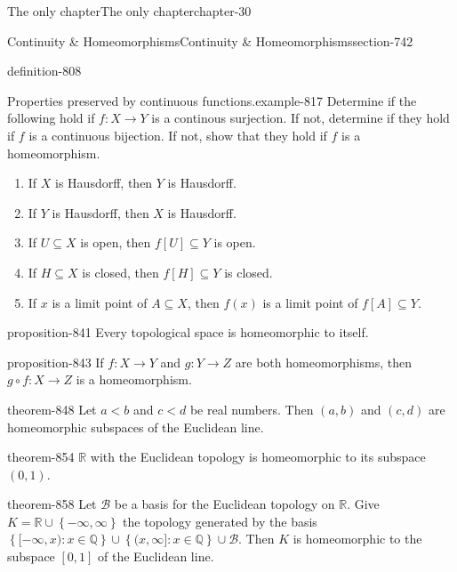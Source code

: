 \documentclass[oneside,10pt,]{book}
\newcommand{\mb}{\mathbb}
\newcommand{\mc}{\mathcal}
\newcommand{\setBuilder}[2]{\left\{#1:#2\right\}}
\newcommand{\setList}[1]{\left\{#1\right\}}
\newcommand{\lt}{<}
\begin{document}
\begin{chapterptx}{The only chapter}{}{The only chapter}{}{}{chapter-30}
\begin{sectionptx}{Continuity \& Homeomorphisms}{}{Continuity \& Homeomorphisms}{}{}{section-742}
\begin{definition}{}{definition-808}
\end{definition}
\begin{example}{Properties preserved by continuous functions.}{example-817}%
\hypertarget{p-819}{}%
Determine if the following hold if \(f:X\to Y\) is a continous surjection. If not, determine if they hold if \(f\) is a continuous bijection. If not, show that they hold if \(f\) is a homeomorphism.%
\leavevmode%
\begin{enumerate}
\item\hypertarget{li-824}{}If \(X\) is Hausdorff, then \(Y\) is Hausdorff.%
\item\hypertarget{li-827}{}If \(Y\) is Hausdorff, then \(X\) is Hausdorff.%
\item\hypertarget{li-830}{}If \(U\subseteq X\) is open, then \(f[U]\subseteq Y\) is open.%
\item\hypertarget{li-833}{}If \(H\subseteq X\) is closed, then \(f[H]\subseteq Y\) is closed.%
\item\hypertarget{li-836}{}If \(x\) is a limit point of \(A\subseteq X\), then \(f(x)\) is a limit point of \(f[A]\subseteq Y\).%
\end{enumerate}
\end{example}
\begin{proposition}{}{}{proposition-841}%
\hypertarget{p-842}{}%
Every topological space is homeomorphic to itself.%
\end{proposition}
\begin{proposition}{}{}{proposition-843}%
\hypertarget{p-844}{}%
If \(f:X\to Y\) and \(g:Y\to Z\) are both homeomorphisms, then \(g\circ f:X\to Z\) is a homeomorphism.%
\end{proposition}
\begin{theorem}{}{}{theorem-848}%
\hypertarget{p-849}{}%
Let \(a\lt b\) and \(c\lt d\) be real numbers. Then \((a,b)\) and \((c,d)\) are homeomorphic subspaces of the Euclidean line.%
\end{theorem}
\begin{theorem}{}{}{theorem-854}%
\hypertarget{p-855}{}%
\(\mb R\) with the Euclidean topology is homeomorphic to its subspace \((0,1)\).%
\end{theorem}
\begin{theorem}{}{}{theorem-858}%
\hypertarget{p-859}{}%
Let \(\mc B\) be a basis for the Euclidean topology on \(\mb R\). Give \(K=\mb R\cup\setList{-\infty,\infty}\) the topology generated by the basis \(\setBuilder{[-\infty,x)}{x\in\mb Q}\cup
\setBuilder{(x,\infty]}{x\in\mb Q}\cup\mc B\). Then \(K\) is homeomorphic to the subspace \([0,1]\) of the Euclidean line.%

\end{theorem}
\end{sectionptx}
\end{chapterptx}
\end{document}
